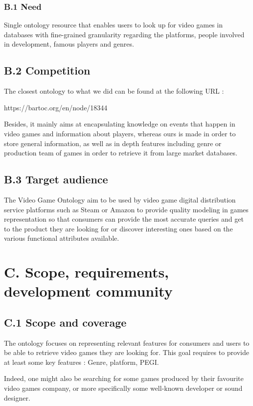 \documentclass{article}
\begin{document}
\subsubsection*{B.1 Need}

Single ontology resource that enables users to look up for video games in databases with fine-grained granularity regarding the platforms, people involved in development, famous players and genres.

\subsection*{B.2 Competition}

The closest ontology to what we did can be found at the following URL : 
 
 
https://bartoc.org/en/node/18344

Besides, it mainly aims at encapsulating knowledge on events that happen in video games and information about players, whereas ours is made in order to store general information, as well as in depth features including genre or production team of games in order to retrieve it from large market databases.

\subsection*{B.3 Target audience}

The Video Game Ontology aim to be used by video game digital distribution service platforms such as Steam or Amazon to provide quality modeling in games representation so that consumers can provide the most accurate queries and get to the product they are looking for or discover interesting ones based on the various functional attributes available. 

\section*{C. Scope, requirements, development community}
\subsection*{C.1 Scope and coverage}
The ontology focuses on representing relevant features for consumers and users to be able to retrieve video games they are looking for. This goal requires to provide at least some key features : Genre, platform, PEGI. 

Indeed, one might also be searching for some games produced by their favourite video games company, or more specifically some well-known developer or sound designer. 
\end{document}
